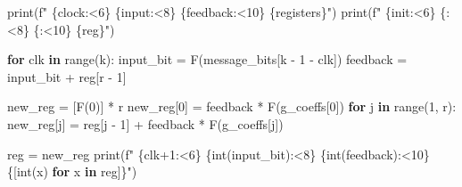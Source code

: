 \documentclass[
]{article}
\newenvironment{Shaded}{}{}
\newcommand{\BuiltInTok}[1]{\textcolor[rgb]{0.00,0.50,0.00}{#1}}
\newcommand{\ControlFlowTok}[1]{\textcolor[rgb]{0.00,0.44,0.13}{\textbf{#1}}}
\newcommand{\DecValTok}[1]{\textcolor[rgb]{0.25,0.63,0.44}{#1}}
\newcommand{\KeywordTok}[1]{\textcolor[rgb]{0.00,0.44,0.13}{\textbf{#1}}}
\newcommand{\NormalTok}[1]{#1}
\newcommand{\OperatorTok}[1]{\textcolor[rgb]{0.40,0.40,0.40}{#1}}
\newcommand{\SpecialCharTok}[1]{\textcolor[rgb]{0.25,0.44,0.63}{#1}}
\newcommand{\SpecialStringTok}[1]{\textcolor[rgb]{0.73,0.40,0.53}{#1}}
\newcommand{\StringTok}[1]{\textcolor[rgb]{0.25,0.44,0.63}{#1}}
\begin{document}
\begin{Shaded}
\begin{Highlighting}[]
    \BuiltInTok{print}\NormalTok{(}\SpecialStringTok{f"  }\SpecialCharTok{\{}\StringTok{\textquotesingle{}clock\textquotesingle{}}\SpecialCharTok{:\textless{}6\}}\SpecialStringTok{ }\SpecialCharTok{\{}\StringTok{\textquotesingle{}input\textquotesingle{}}\SpecialCharTok{:\textless{}8\}}\SpecialStringTok{ }\SpecialCharTok{\{}\StringTok{\textquotesingle{}feedback\textquotesingle{}}\SpecialCharTok{:\textless{}10\}}\SpecialStringTok{ }\SpecialCharTok{\{}\StringTok{\textquotesingle{}registers\textquotesingle{}}\SpecialCharTok{\}}\SpecialStringTok{"}\NormalTok{)}
    \BuiltInTok{print}\NormalTok{(}\SpecialStringTok{f"  }\SpecialCharTok{\{}\StringTok{\textquotesingle{}init\textquotesingle{}}\SpecialCharTok{:\textless{}6\}}\SpecialStringTok{ }\SpecialCharTok{\{}\StringTok{\textquotesingle{}{-}\textquotesingle{}}\SpecialCharTok{:\textless{}8\}}\SpecialStringTok{ }\SpecialCharTok{\{}\StringTok{\textquotesingle{}{-}\textquotesingle{}}\SpecialCharTok{:\textless{}10\}}\SpecialStringTok{ }\SpecialCharTok{\{}\NormalTok{reg}\SpecialCharTok{\}}\SpecialStringTok{"}\NormalTok{)}

    \ControlFlowTok{for}\NormalTok{ clk }\KeywordTok{in} \BuiltInTok{range}\NormalTok{(k):}
\NormalTok{        input\_bit }\OperatorTok{=}\NormalTok{ F(message\_bits[k }\OperatorTok{{-}} \DecValTok{1} \OperatorTok{{-}}\NormalTok{ clk])}
\NormalTok{        feedback }\OperatorTok{=}\NormalTok{ input\_bit }\OperatorTok{+}\NormalTok{ reg[r }\OperatorTok{{-}} \DecValTok{1}\NormalTok{]}

\NormalTok{        new\_reg }\OperatorTok{=}\NormalTok{ [F(}\DecValTok{0}\NormalTok{)] }\OperatorTok{*}\NormalTok{ r}
\NormalTok{        new\_reg[}\DecValTok{0}\NormalTok{] }\OperatorTok{=}\NormalTok{ feedback }\OperatorTok{*}\NormalTok{ F(g\_coeffs[}\DecValTok{0}\NormalTok{])}
        \ControlFlowTok{for}\NormalTok{ j }\KeywordTok{in} \BuiltInTok{range}\NormalTok{(}\DecValTok{1}\NormalTok{, r):}
\NormalTok{            new\_reg[j] }\OperatorTok{=}\NormalTok{ reg[j }\OperatorTok{{-}} \DecValTok{1}\NormalTok{] }\OperatorTok{+}\NormalTok{ feedback }\OperatorTok{*}\NormalTok{ F(g\_coeffs[j])}

\NormalTok{        reg }\OperatorTok{=}\NormalTok{ new\_reg}
        \BuiltInTok{print}\NormalTok{(}\SpecialStringTok{f"  }\SpecialCharTok{\{}\NormalTok{clk}\OperatorTok{+}\DecValTok{1}\SpecialCharTok{:\textless{}6\}}\SpecialStringTok{ }\SpecialCharTok{\{}\BuiltInTok{int}\NormalTok{(input\_bit)}\SpecialCharTok{:\textless{}8\}}\SpecialStringTok{ }\SpecialCharTok{\{}\BuiltInTok{int}\NormalTok{(feedback)}\SpecialCharTok{:\textless{}10\}}\SpecialStringTok{ }\SpecialCharTok{\{}\NormalTok{[}\BuiltInTok{int}\NormalTok{(x) }\ControlFlowTok{for}\NormalTok{ x }\KeywordTok{in}\NormalTok{ reg]}\SpecialCharTok{\}}\SpecialStringTok{"}\NormalTok{)}


\end{Highlighting}
\end{Shaded}
\end{document}
